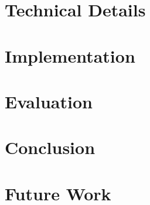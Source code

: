 \documentclass[acmsmall, nonacm]{acmart}
\begin{document}
\section{Technical Details}

\section{Implementation}

\section{Evaluation}

\section{Conclusion}

\section{Future Work}







\end{document}
